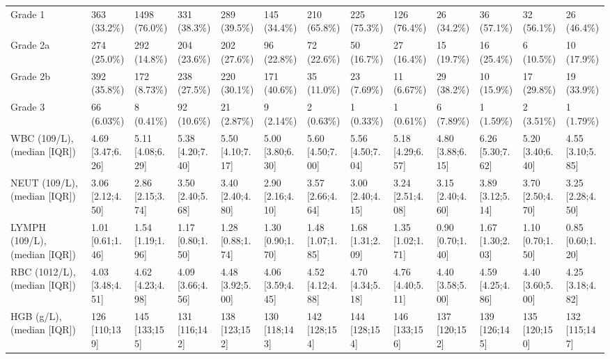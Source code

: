 \begin{landscape}
\begin{center}
\begin{longtable}{p{6.0cm}p{3.0cm}p{3.0cm}p{3.0cm}p{3.0cm}p{3.0cm}p{3.0cm}p{3.0cm}p{3.0cm}p{3.0cm}p{3.0cm}p{3.0cm}p{3.0cm}}
    Grade 1 &   363 (33.2\%)    &   1498 (76.0\%)   &   331 (38.3\%)    &   289 (39.5\%)    &   145 (34.4\%)    &   210 (65.8\%)    &   225 (75.3\%)    &   126 (76.4\%)    &    26 (34.2\%)    &    36 (57.1\%)    &    32 (56.1\%)    &    26 (46.4\%)    \\
    Grade 2a &   274 (25.0\%)    &   292 (14.8\%)    &   204 (23.6\%)    &   202 (27.6\%)    &    96 (22.8\%)    &    72 (22.6\%)    &    50 (16.7\%)    &    27 (16.4\%)    &    15 (19.7\%)    &    16 (25.4\%)    &    6 (10.5\%)     &    10 (17.9\%)    \\
    Grade 2b &   392 (35.8\%)    &   172 (8.73\%)    &   238 (27.5\%)    &   220 (30.1\%)    &   171 (40.6\%)    &    35 (11.0\%)    &    23 (7.69\%)    &    11 (6.67\%)    &    29 (38.2\%)    &    10 (15.9\%)    &    17 (29.8\%)    &    19 (33.9\%)    \\
    Grade 3 &    66 (6.03\%)    &    8 (0.41\%)     &    92 (10.6\%)    &    21 (2.87\%)    &    9 (2.14\%)     &    2 (0.63\%)     &    1 (0.33\%)     &    1 (0.61\%)     &    6 (7.89\%)     &    1 (1.59\%)     &    2 (3.51\%)     &    1 (1.79\%)     \\
WBC (109/L), (median [IQR]) & 4.69 [3.47;6.26] & 5.11 [4.08;6.29] & 5.38 [4.20;7.40] & 5.50 [4.10;7.17] & 5.00 [3.80;6.30] & 5.60 [4.50;7.00] & 5.56 [4.50;7.04] & 5.18 [4.29;6.57] & 4.80 [3.88;6.15] & 6.26 [5.30;7.62] & 5.20 [3.40;6.40] & 4.55 [3.10;5.85] \\
NEUT (109/L), (median [IQR]) & 3.06 [2.12;4.50] & 2.86 [2.15;3.74] & 3.50 [2.40;5.68] & 3.40 [2.40;4.80] & 2.90 [2.16;4.10] & 3.57 [2.66;4.64] & 3.00 [2.40;4.15] & 3.24 [2.51;4.08] & 3.15 [2.40;4.60] & 3.89 [3.12;5.14] & 3.70 [2.50;4.70] & 3.25 [2.28;4.50] \\
LYMPH (109/L), (median [IQR]) & 1.01 [0.61;1.46] & 1.54 [1.19;1.96] & 1.17 [0.80;1.50] & 1.28 [0.88;1.74] & 1.30 [0.90;1.70] & 1.48 [1.07;1.85] & 1.68 [1.31;2.09] & 1.35 [1.02;1.71] & 0.90 [0.70;1.40] & 1.67 [1.30;2.03] & 1.10 [0.70;1.50] & 0.85 [0.60;1.20] \\
RBC (1012/L), (median [IQR]) & 4.03 [3.48;4.51] & 4.62 [4.23;4.98] & 4.09 [3.66;4.56] & 4.48 [3.92;5.00] & 4.06 [3.59;4.45] & 4.52 [4.12;4.88] & 4.70 [4.34;5.18] & 4.76 [4.40;5.11] & 4.40 [3.58;5.00] & 4.59 [4.25;4.86] & 4.40 [3.60;5.00] & 4.25 [3.18;4.82] \\
HGB (g/L), (median [IQR]) &  126 [110;139]   &  145 [133;155]   &  131 [116;142]   &  138 [123;152]   &  130 [118;143]   &  142 [128;154]   &  144 [128;154]   &  146 [133;156]   &  137 [120;152]   &  139 [126;145]   &  135 [120;150]   &  132 [115;147]   \\

\end{longtable}
\end{center}
\end{landscape}
